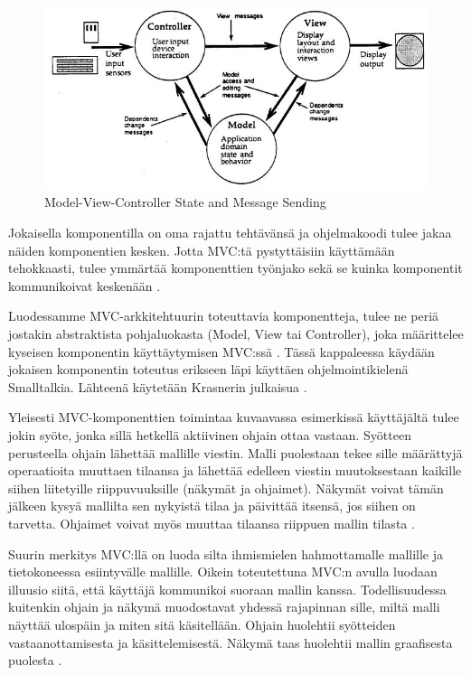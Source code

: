 \documentclass[utf8]{gradu3}
\begin{document}
\begin{figure}[h]
\centering
\includegraphics[scale=0.85]{krasner_mvc.jpg}
\caption{Model-View-Controller State and Message Sending \cite[s. 5]{krasner_desc}}
\end{figure} 
Jokaisella komponentilla on oma rajattu tehtävänsä ja ohjelmakoodi tulee jakaa näiden komponentien kesken. Jotta MVC:tä pystyttäisiin käyttämään
tehokkaasti, tulee ymmärtää komponenttien työnjako sekä se kuinka komponentit kommunikoivat keskenään \parencite{burbeck}. 

Luodessamme MVC-arkkitehtuurin toteuttavia komponentteja, tulee ne periä jostakin abstraktista pohjaluokasta (Model, View tai Controller), joka määrittelee kyseisen komponentin käyttäytymisen MVC:ssä  \parencite[s. 5]{krasner_desc}.  Tässä kappaleessa käydään jokaisen komponentin toteutus erikseen läpi käyttäen ohjelmointikielenä Smalltalkia. Lähteenä käytetään Krasnerin julkaisua \parencite{krasner_desc}.

Yleisesti MVC-komponenttien toimintaa kuvaavassa esimerkissä käyttäjältä tulee jokin syöte, jonka sillä hetkellä aktiivinen ohjain ottaa vastaan. Syötteen perusteella ohjain lähettää mallille viestin. Malli puolestaan tekee sille määrättyjä operaatioita muuttaen tilaansa ja lähettää edelleen viestin muutoksestaan kaikille siihen liitetyille riippuvuuksille (näkymät ja ohjaimet). Näkymät
voivat tämän jälkeen kysyä mallilta sen nykyistä tilaa ja päivittää itsensä, jos siihen on tarvetta. Ohjaimet voivat myös muuttaa tilaansa riippuen mallin tilasta \parencite[s. 4]{krasner_desc}. 

Suurin merkitys MVC:llä on luoda silta ihmismielen hahmottamalle mallille ja tietokoneessa esiintyvälle mallille. Oikein toteutettuna MVC:n avulla luodaan illuusio siitä, että käyttäjä kommunikoi suoraan mallin kanssa. Todellisuudessa kuitenkin ohjain ja näkymä muodostavat yhdessä rajapinnan sille, miltä malli näyttää ulospäin ja miten sitä käsitellään. Ohjain huolehtii syötteiden vastaanottamisesta ja käsittelemisestä. Näkymä taas huolehtii mallin graafisesta puolesta \parencite[s. 11-12]{reenskaug_tools}. 
\end{document}
